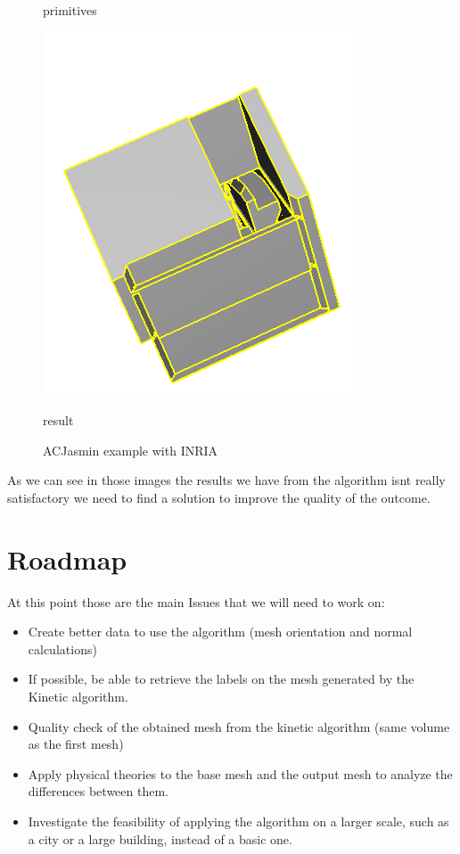 \documentclass{article}
\begin{document}
\begin{figure}[H]
\begin{minipage}[t]{0.29\textwidth}
    \caption*{primitives}
  \end{minipage}
  \begin{minipage}[t]{0.27\textwidth}
    \includegraphics[width=\textwidth]{../../images/screen_kinetic/ACJasmin_result_INRIA.png}
    \caption*{result}
  \end{minipage}
  \caption{ACJasmin example with INRIA}
\end{figure}  
As we can see in those images the results we have from the 
algorithm isnt really satisfactory we need to find a solution 
to improve the quality of the outcome.


\section{Roadmap}
At this point those are the main Issues that we will need to work on:
\begin{itemize}
  \item Create better data to use the algorithm (mesh orientation and normal calculations)
  \item If possible, be able to retrieve the labels on the mesh generated by the Kinetic algorithm.
  \item Quality check of the obtained mesh from the kinetic algorithm (same volume as the first mesh)
  \item Apply physical theories to the base mesh and the output mesh to analyze the differences between them.
  \item Investigate the feasibility of applying the algorithm on a larger scale, such as a city or a large building, instead of a basic one.
\end{itemize}
\end{document}
